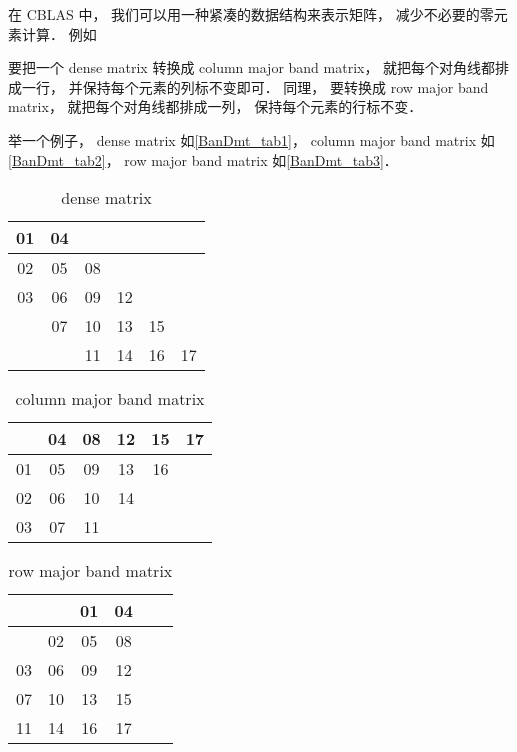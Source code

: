 
\begin{issues}
\issueDraft
\issueMissDepend
\end{issues}


在 CBLAS 中， 我们可以用一种紧凑的数据结构来表示矩阵， 减少不必要的零元素计算． 例如

要把一个 dense matrix 转换成 column major band matrix， 就把每个对角线都排成一行， 并保持每个元素的列标不变即可． 同理， 要转换成 row major band matrix， 就把每个对角线都排成一列， 保持每个元素的行标不变．

举一个例子， dense matrix 如\autoref{BanDmt_tab1}， column major band matrix 如\autoref{BanDmt_tab2}， row major band matrix 如\autoref{BanDmt_tab3}．

\begin{table}[ht]
\centering
\caption{dense matrix}\label{BanDmt_tab1}
\begin{tabular}{|c|c|c|c|c|c|}
\hline
01  & 04  &    &    &    &   \\
\hline
02  & 05  & 08  &    &    &   \\
\hline
03  & 06  & 09  & 12  &    &   \\
\hline
   & 07  & 10 &  13  & 15  &   \\
\hline
   &    & 11 &  14  & 16  & 17 \\
\hline
\end{tabular}
\end{table}

\begin{table}[ht]
\centering
\caption{column major band matrix}\label{BanDmt_tab2}
\begin{tabular}{|c|c|c|c|c|c|}
\hline
   & 04  & 08  & 12 &  15 &  17 \\
\hline
01  & 05  & 09  & 13 &  16 &    \\
\hline
02  & 06  & 10 & 14 &     &    \\
\hline
03  & 07  & 11 &    &     &    \\
\hline
\end{tabular}
\end{table}

\begin{table}[ht]
\centering
\caption{row major band matrix}\label{BanDmt_tab3}
\begin{tabular}{|c|c|c|c|c|c|}
\hline
   &     &  01  &  04 \\
\hline
   &  02  &  05  &  08 \\
\hline
03  &  06  &  09  &  12 \\
\hline
07  &  10 &  13 &  15 \\
\hline
11 &  14 &  16 &  17 \\
\hline
\end{tabular}
\end{table}

